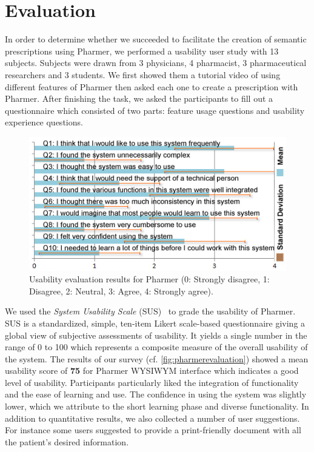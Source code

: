 \documentclass[10pt, conference, compsocconf]{IEEEtran}
\begin{document}
\section{Evaluation}
\label{sec:evaluation}
In order to determine whether we succeeded to facilitate the creation of semantic prescriptions using Pharmer, we performed a usability user study with 13 subjects.
Subjects were drawn from 3 physicians, 4 pharmacist, 3 pharmaceutical researchers and 3 students.
We first showed them a tutorial video of using different features of Pharmer then asked each one to create a prescription with Pharmer.
After finishing the task, we asked the participants to fill out a questionnaire which consisted of two parts: feature usage questions and usability experience questions.

\begin{figure}[tb]
	\centering
		\includegraphics[width=1\columnwidth]{images/pharmer_evaluation.jpg}
	\caption{Usability evaluation results for Pharmer (0: Strongly disagree, 1: Disagree, 2: Neutral, 3: Agree, 4: Strongly agree).}
	\label{fig:pharmerevaluation}
\end{figure}
We used the \emph{System Usability Scale} (SUS)~\cite{SUS2009} to grade the usability of Pharmer.
SUS is a standardized, simple, ten-item Likert scale-based questionnaire giving a global view of subjective assessments of usability.
It yields a single number in the range of 0 to 100 which represents a composite measure of the overall usability of the system.
The results of our survey (cf. \autoref{fig:pharmerevaluation}) showed a mean usability score of \textbf{75} for Pharmer WYSIWYM interface which indicates a good level of usability.
Participants particularly liked the integration of functionality and the ease of learning and use.
The confidence in using the system was slightly lower, which we attribute to the short learning phase and diverse functionality.
In addition to quantitative results, we also collected a number of user suggestions.
For instance some users suggested to provide a print-friendly document with all the patient's desired information.
\end{document}
